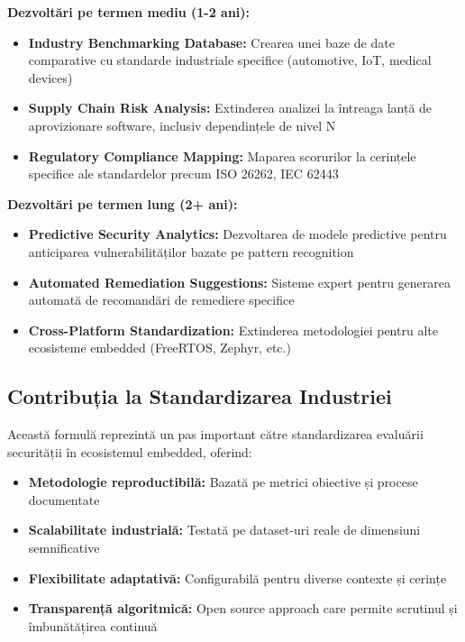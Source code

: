 \documentclass[12pt,a4paper]{article}
\begin{document}
\textbf{Dezvoltări pe termen mediu (1-2 ani):}

\begin{itemize}
\item \textbf{Industry Benchmarking Database:} Crearea unei baze de date comparative cu standarde industriale specifice (automotive, IoT, medical devices)
\item \textbf{Supply Chain Risk Analysis:} Extinderea analizei la întreaga lanță de aprovizionare software, inclusiv dependințele de nivel N
\item \textbf{Regulatory Compliance Mapping:} Maparea scorurilor la cerințele specifice ale standardelor precum ISO 26262, IEC 62443
\end{itemize}

\textbf{Dezvoltări pe termen lung (2+ ani):}

\begin{itemize}
\item \textbf{Predictive Security Analytics:} Dezvoltarea de modele predictive pentru anticiparea vulnerabilităților bazate pe pattern recognition
\item \textbf{Automated Remediation Suggestions:} Sisteme expert pentru generarea automată de recomandări de remediere specifice
\item \textbf{Cross-Platform Standardization:} Extinderea metodologiei pentru alte ecosisteme embedded (FreeRTOS, Zephyr, etc.)
\end{itemize}

\subsection{Contribuția la Standardizarea Industriei}

Această formulă reprezintă un pas important către standardizarea evaluării securității în ecosistemul embedded, oferind:

\begin{itemize}
\item \textbf{Metodologie reproductibilă:} Bazată pe metrici obiective și procese documentate
\item \textbf{Scalabilitate industrială:} Testată pe dataset-uri reale de dimensiuni semnificative
\item \textbf{Flexibilitate adaptativă:} Configurabilă pentru diverse contexte și cerințe
\item \textbf{Transparență algoritmică:} Open source approach care permite scrutinul și îmbunătățirea continuă
\end{itemize}
\end{document}
